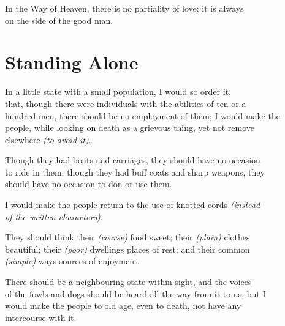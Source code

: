     In the Way of Heaven, there is no partiality of love; it is always\\
    on the side of the good man.\vspace{\baselineskip}
    
\section*{Standing Alone}
    In a little state with a small population, I would so order it,\\
    that, though there were individuals with the abilities of ten or a\\
    hundred men, there should be no employment of them; I would make the\\
    people, while looking on death as a grievous thing, yet not remove\\
    elsewhere \textit{(to avoid it)}.\vspace{\baselineskip}
    
    Though they had boats and carriages, they should have no occasion\\
    to ride in them; though they had buff coats and sharp weapons, they\\
    should have no occasion to don or use them.\vspace{\baselineskip}
    
    I would make the people return to the use of knotted cords \textit{(instead\\
    of the written characters)}.\vspace{\baselineskip}
    
    They should think their \textit{(coarse)} food sweet; their \textit{(plain)} clothes\\
    beautiful; their \textit{(poor)} dwellings places of rest; and their common\\
    \textit{(simple)} ways sources of enjoyment.\vspace{\baselineskip}
    
    There should be a neighbouring state within sight, and the voices\\
    of the fowls and dogs should be heard all the way from it to us, but I\\
    would make the people to old age, even to death, not have any\\
    intercourse with it.\vspace{\baselineskip}
    
